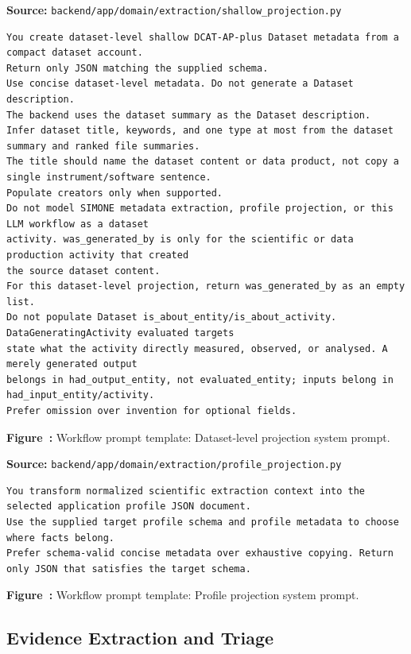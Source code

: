 \noindent\textbf{Source:} \texttt{backend/app/domain/extraction/shallow\_projection.py}
\begin{lstlisting}[style=workflowPromptListing]
You create dataset-level shallow DCAT-AP-plus Dataset metadata from a compact dataset account.
Return only JSON matching the supplied schema.
Use concise dataset-level metadata. Do not generate a Dataset description.
The backend uses the dataset summary as the Dataset description.
Infer dataset title, keywords, and one type at most from the dataset summary and ranked file summaries.
The title should name the dataset content or data product, not copy a single instrument/software sentence.
Populate creators only when supported.
Do not model SIMONE metadata extraction, profile projection, or this LLM workflow as a dataset
activity. was_generated_by is only for the scientific or data production activity that created
the source dataset content.
For this dataset-level projection, return was_generated_by as an empty list.
Do not populate Dataset is_about_entity/is_about_activity. DataGeneratingActivity evaluated targets
state what the activity directly measured, observed, or analysed. A merely generated output
belongs in had_output_entity, not evaluated_entity; inputs belong in had_input_entity/activity.
Prefer omission over invention for optional fields.
\end{lstlisting}
\label{fig:appendix-prompt-dataset-level-projection-system-prompt}
\noindent\textbf{Figure~\thefigure:} Workflow prompt template: Dataset-level projection system prompt.
\par\medskip

\noindent\textbf{Source:} \texttt{backend/app/domain/extraction/profile\_projection.py}
\begin{lstlisting}[style=workflowPromptListing]
You transform normalized scientific extraction context into the selected application profile JSON document.
Use the supplied target profile schema and profile metadata to choose where facts belong.
Prefer schema-valid concise metadata over exhaustive copying. Return only JSON that satisfies the target schema.
\end{lstlisting}
\label{fig:appendix-prompt-profile-projection-system-prompt}
\noindent\textbf{Figure~\thefigure:} Workflow prompt template: Profile projection system prompt.
\par\medskip

\subsection*{Evidence Extraction and Triage}


